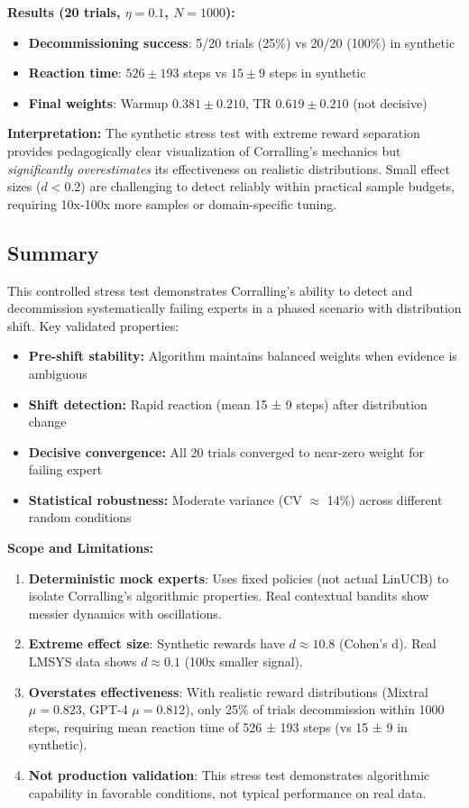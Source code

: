 \textbf{Results (20 trials, $\eta=0.1$, $N=1000$):}
\begin{itemize}
    \item \textbf{Decommissioning success}: 5/20 trials (25\%) vs 20/20 (100\%) in synthetic
    \item \textbf{Reaction time}: $526 \pm 193$ steps vs $15 \pm 9$ steps in synthetic
    \item \textbf{Final weights}: Warmup $0.381 \pm 0.210$, TR $0.619 \pm 0.210$ (not decisive)
\end{itemize}

\textbf{Interpretation:} The synthetic stress test with extreme reward separation provides pedagogically clear visualization of Corralling's mechanics but \emph{significantly overestimates} its effectiveness on realistic distributions. Small effect sizes ($d<0.2$) are challenging to detect reliably within practical sample budgets, requiring 10x-100x more samples or domain-specific tuning.

\subsection{Summary}

This controlled stress test demonstrates Corralling's ability to detect and decommission systematically failing experts in a phased scenario with distribution shift. Key validated properties:

\begin{itemize}
    \item \textbf{Pre-shift stability:} Algorithm maintains balanced weights when evidence is ambiguous
    \item \textbf{Shift detection:} Rapid reaction (mean 15 ± 9 steps) after distribution change
    \item \textbf{Decisive convergence:} All 20 trials converged to near-zero weight for failing expert
    \item \textbf{Statistical robustness:} Moderate variance (CV $\approx$ 14\%) across different random conditions
\end{itemize}

\textbf{Scope and Limitations:} 
\begin{enumerate}
    \item \textbf{Deterministic mock experts}: Uses fixed policies (not actual LinUCB) to isolate Corralling's algorithmic properties. Real contextual bandits show messier dynamics with oscillations.
    \item \textbf{Extreme effect size}: Synthetic rewards have $d \approx 10.8$ (Cohen's d). Real LMSYS data shows $d \approx 0.1$ (100x smaller signal).
    \item \textbf{Overstates effectiveness}: With realistic reward distributions (Mixtral $\mu=0.823$, GPT-4 $\mu=0.812$), only 25\% of trials decommission within 1000 steps, requiring mean reaction time of 526 ± 193 steps (vs 15 ± 9 in synthetic).
    \item \textbf{Not production validation}: This stress test demonstrates algorithmic capability in favorable conditions, not typical performance on real data.
\end{enumerate}

